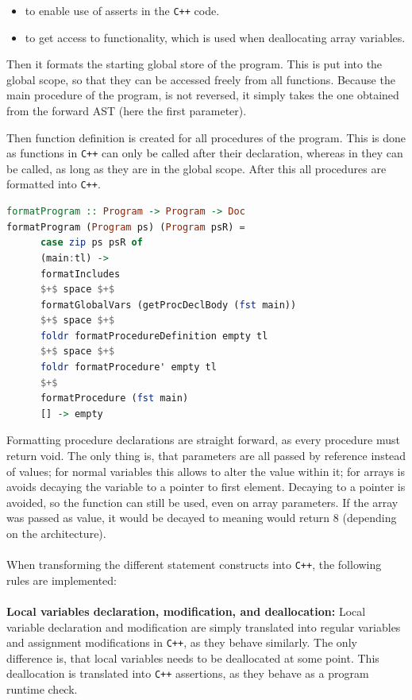 \begin{itemize}
      \item {} to enable use of asserts in the \texttt{C++} code.

      \item {} to get access to  functionality, which is used
            when deallocating array variables.
\end{itemize}
\noindent
Then it formats the starting global store of the \lan program. This is put into the global
scope, so that they can be accessed freely from all functions. Because the main procedure of
the \lan program, is not reversed, it simply takes the one obtained from the forward AST
(here the first parameter).

Then function definition is created for all procedures of the program. This is done as
functions in \texttt{C++} can only be called after their declaration, whereas in \lan
they can be called, as long as they are in the global scope.
After this all procedures are formatted into \texttt{C++}.

\begin{lstlisting}[language=Haskell, label={lst:formatMain}, caption={Formatting AST into \texttt{C++}}]
formatProgram :: Program -> Program -> Doc
formatProgram (Program ps) (Program psR) =
      case zip ps psR of
      (main:tl) ->
      formatIncludes
      $+$ space $+$
      formatGlobalVars (getProcDeclBody (fst main))
      $+$ space $+$
      foldr formatProcedureDefinition empty tl
      $+$ space $+$
      foldr formatProcedure' empty tl
      $+$
      formatProcedure (fst main)
      [] -> empty
\end{lstlisting}
\noindent
Formatting procedure declarations are straight forward, as every procedure must return void.
The only thing is, that parameters are all passed by reference instead of values; for
normal variables this allows to alter the value within it; for arrays is avoids decaying the
variable to a pointer to first element. Decaying to a pointer is avoided, so the function
 can still be used, even on array parameters. If the array was passed as value,
it would be decayed to  meaning  would return $8$ (depending on the
architecture).
\\
\\
When transforming the different statement constructs into \texttt{C++}, the following rules
are implemented:
\\
\\
\textbf{Local variables declaration, modification, and deallocation:}
Local variable declaration and modification are simply translated into regular variables and
assignment modifications in \texttt{C++}, as they behave
similarly. The only difference is, that \lan local variables needs to be deallocated at some
point. This deallocation is translated into \texttt{C++} assertions, as they behave as a
program runtime check.

